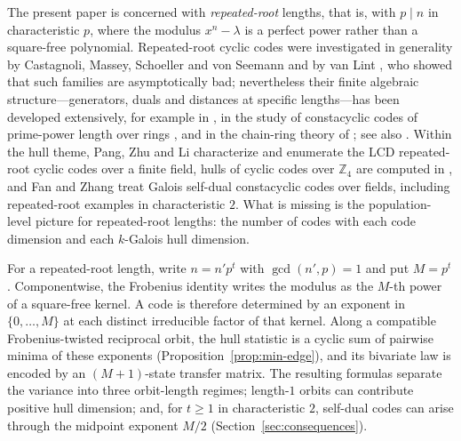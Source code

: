 The present paper is concerned with \emph{repeated-root} lengths, that is,
with $p\mid n$ in characteristic $p$, where the modulus $x^n-\lambda$ is a
perfect power rather than a square-free polynomial. Repeated-root cyclic
codes were investigated in generality by Castagnoli, Massey, Schoeller and
von Seemann \cite{castagnoli1991} and by van Lint \cite{vanLint1991}, who
showed that such families are asymptotically bad; nevertheless their finite
algebraic structure---generators, duals and distances at specific
lengths---has been developed extensively, for example in
\cite{dinh2012}, in the study of constacyclic codes of prime-power length over
rings \cite{dinh2010}, and in the chain-ring theory of
\cite{dinhLopezPermouth2004}; see also \cite{nortonSalagean2000}. Within the hull theme,
Pang, Zhu and Li \cite{pangZhuLi2018} characterize and enumerate the LCD
repeated-root cyclic codes over a finite field, hulls of cyclic codes over $\mathbb{Z}_4$ are computed in
\cite{jitmanZ4}, and Fan and Zhang
\cite{fanZhang2017} treat Galois self-dual constacyclic codes over fields,
including repeated-root examples in characteristic $2$. What is missing is
the population-level picture for repeated-root lengths: the number of codes
with each code dimension and each $k$-Galois hull dimension.

For a repeated-root length, write $n=n'p^t$ with $\gcd(n',p)=1$ and put
$M=p^t$. Componentwise, the Frobenius identity writes the modulus as the
$M$-th power of a square-free kernel. A code is therefore determined by an
exponent in $\{0,\dots,M\}$ at each distinct irreducible factor of that
kernel. Along a compatible Frobenius-twisted reciprocal orbit, the hull
statistic is a cyclic sum of pairwise minima of these exponents
(Proposition~\ref{prop:min-edge}), and its bivariate law is encoded by an
$(M+1)$-state transfer matrix. The resulting formulas separate the variance
into three orbit-length regimes; length-$1$ orbits can contribute positive
hull dimension; and, for $t\geq1$ in characteristic $2$, self-dual codes can
arise through the midpoint exponent $M/2$
(Section~\ref{sec:consequences}).

